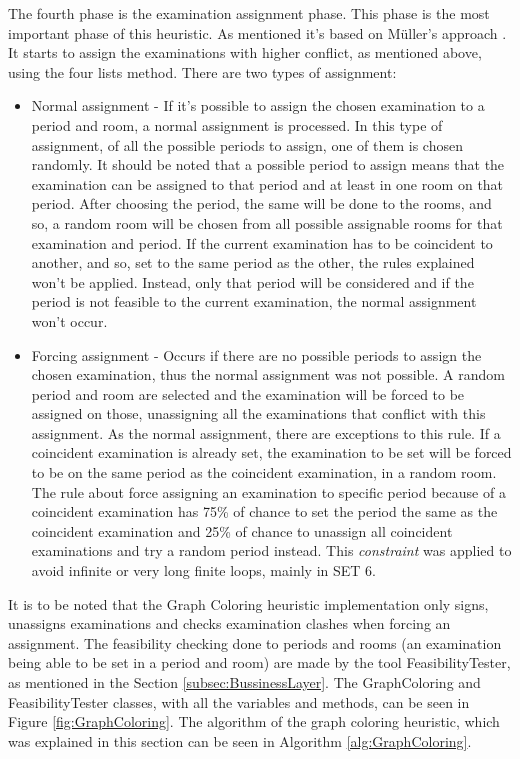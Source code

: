 The fourth phase is the examination assignment phase. This phase is the most important phase of this heuristic. As mentioned it's based on 
M\"{u}ller's approach \cite{Mueller2009}. It starts to assign the examinations with higher conflict, as mentioned above, using the four lists method. There are two types of assignment:

\begin{itemize}
	\item Normal assignment - If it's possible to assign the chosen examination to a period and room, a normal assignment is processed. In this type of assignment, of all the possible periods to assign, one of them is chosen randomly. It should be noted that a possible period to assign means that the examination can be assigned to that period and at least in one room on that period. After choosing the period, the same will be done to the rooms, and so, a random room will be chosen from all possible assignable rooms for that examination and period. If the current examination has to be coincident to another, and so, set to the same period as the other, the rules explained won't be applied. Instead, only that period will be considered and if the period is not feasible to the current examination, the normal assignment won't occur. \\
	\item Forcing assignment - Occurs if there are no possible periods to assign the chosen examination, thus the normal assignment was not possible. A random period and room are selected and the examination will be forced to be assigned on those, unassigning all the examinations that conflict with this assignment. As the normal assignment, there are exceptions to this rule. If a coincident examination is already set, the examination to be set will be forced to be on the same period as the coincident examination, in a random room. The rule about force assigning an examination to specific period because of a coincident examination has 75\% of chance to set the period the same as the coincident examination and 25\% of chance to unassign all coincident examinations and try a random period instead. This \textit{constraint} was applied to avoid infinite or very long finite loops, mainly in SET 6.
\end{itemize}

It is to be noted that the Graph Coloring heuristic implementation only signs, unassigns examinations and checks examination clashes when forcing an assignment. The feasibility checking done to periods and rooms (an examination being able to be set in a period and room) are made by the tool FeasibilityTester, as mentioned in the Section \ref{subsec:BussinessLayer}. The GraphColoring and FeasibilityTester classes, with all the variables and methods, can be seen in Figure \ref{fig:GraphColoring}. The algorithm of the graph coloring heuristic, which was explained in this section can be seen in Algorithm \ref{alg:GraphColoring}.\\


